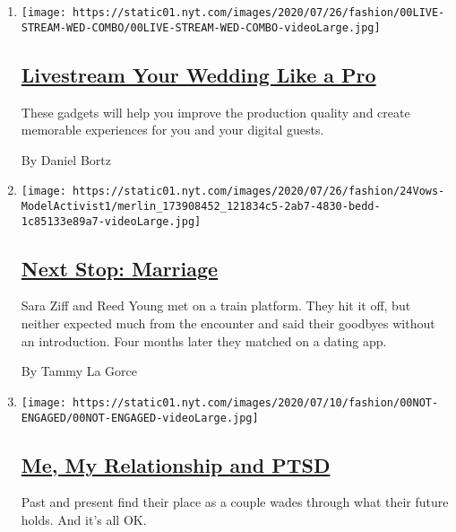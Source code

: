 \begin{enumerate}
\def\labelenumi{\arabic{enumi}.}
\item
  \texttt{[image: https://static01.nyt.com/images/2020/07/26/fashion/00LIVE-STREAM-WED-COMBO/00LIVE-STREAM-WED-COMBO-videoLarge.jpg]}

  \hypertarget{livestream-your-wedding-like-a-pro-1}{%
  \subsection{\texorpdfstring{\href{/2020/07/28/fashion/weddings/livestream-your-wedding-like-a-pro.html}{Livestream
  Your Wedding Like a
  Pro}}{Livestream Your Wedding Like a Pro}}\label{livestream-your-wedding-like-a-pro-1}}

  These gadgets will help you improve the production quality and create
  memorable experiences for you and your digital guests.

  By Daniel Bortz
\item
  \texttt{[image: https://static01.nyt.com/images/2020/07/26/fashion/24Vows-ModelActivist1/merlin\_173908452\_121834c5-2ab7-4830-bedd-1c85133e89a7-videoLarge.jpg]}

  \hypertarget{next-stop-marriage}{%
  \subsection{\texorpdfstring{\href{/2020/07/24/fashion/weddings/Sara-Ziff-marries-Reed-Young-at-train-station.html}{Next
  Stop: Marriage}}{Next Stop: Marriage}}\label{next-stop-marriage}}

  Sara Ziff and Reed Young met on a train platform. They hit it off, but
  neither expected much from the encounter and said their goodbyes
  without an introduction. Four months later they matched on a dating
  app.

  By Tammy La Gorce
\item
  \texttt{[image: https://static01.nyt.com/images/2020/07/10/fashion/00NOT-ENGAGED/00NOT-ENGAGED-videoLarge.jpg]}

  \hypertarget{me-my-relationship-and-ptsd}{%
  \subsection{\texorpdfstring{\href{/2020/07/25/fashion/weddings/me-my-relationship-and-ptsd.html}{Me,
  My Relationship and
  PTSD}}{Me, My Relationship and PTSD}}\label{me-my-relationship-and-ptsd}}

  Past and present find their place as a couple wades through what their
  future holds. And it's all OK.


\end{enumerate}
